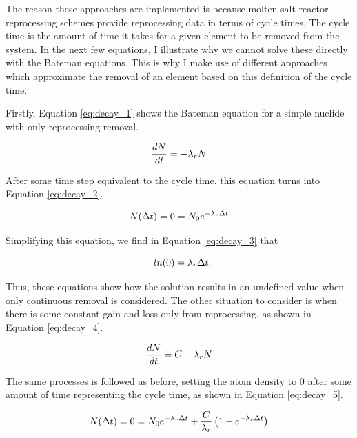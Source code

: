 The reason these approaches are implemented is because molten salt reactor reprocessing schemes provide reprocessing data in terms of cycle times. The cycle time is the amount of time it takes for a given element to be removed from the system.
In the next few equations, I illustrate why we cannot solve these directly with the Bateman equations. This is why I make use of different approaches which approximate the removal of an element based on this definition of the cycle time.

Firstly, Equation \eqref{eq:decay_1} shows the Bateman equation for a simple nuclide with only reprocessing removal.

\begin{equation} \hfill
\frac{dN}{dt} = -\lambda_r N
\hfill\label{eq:decay_1} \end{equation}

After some time step equivalent to the cycle time, this equation turns into Equation \eqref{eq:decay_2}.

\begin{equation} \hfill
N(\Delta t) = 0 = N_0 e^{-\lambda_r \Delta t}
\hfill\label{eq:decay_2} \end{equation}

Simplifying this equation, we find in Equation \eqref{eq:decay_3} that

\begin{equation} \hfill
-ln(0) = \lambda_r \Delta t.
\hfill\label{eq:decay_3} \end{equation}

Thus, these equations show how the solution results in an undefined value when only continuous removal is considered. The other situation to consider is when there is some constant gain and loss only from reprocessing, as shown in Equation \eqref{eq:decay_4}.

\begin{equation} \hfill
\frac{dN}{dt} = C -\lambda_r N
\hfill\label{eq:decay_4} \end{equation}

The same processes is followed as before, setting the atom density to 0 after some amount of time representing the cycle time, as shown in Equation \eqref{eq:decay_5}.

\begin{equation} \hfill
N(\Delta t) = 0 = N_0 e^{-\lambda_r \Delta t} + \frac{C}{\lambda_r} \left( 1 - e^{-\lambda_r \Delta t} \right)
\hfill\label{eq:decay_5} \end{equation}



